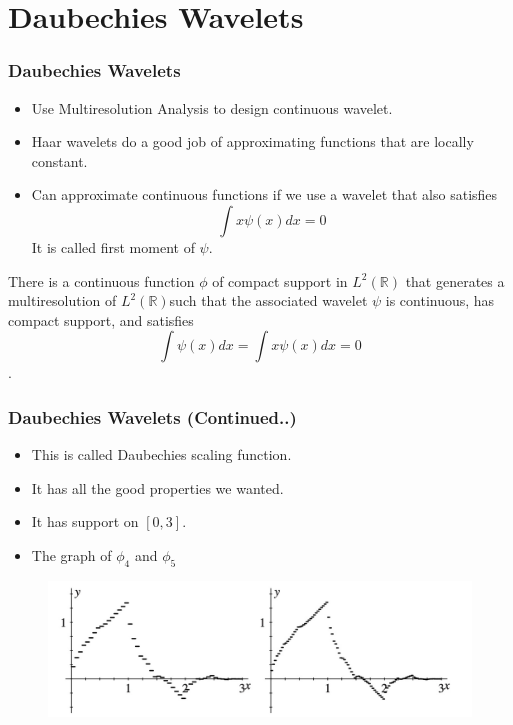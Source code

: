 \documentclass{beamer}
\begin{document}
\section{Daubechies Wavelets} %
\begin{frame}
\frametitle{Daubechies Wavelets}

\begin{itemize}
    \item Use Multiresolution Analysis to design continuous wavelet.
    \item Haar wavelets do a good job of approximating functions that are locally constant.
    \item Can approximate continuous functions if we use a wavelet that also satisfies $$\int x\psi(x) dx = 0$$ It is called first moment of $\psi$.
\end{itemize}

\begin{theorem}[15.5.1]
    There is a continuous function $\phi$ of compact support in $L^2(\mathbb{R}) $
    that generates a multiresolution of $L^2(\mathbb{R}) $such that the associated wavelet $\psi$ is continuous, 
    has compact support, and satisfies $$\int \psi(x) dx = \int x\psi(x) dx = 0$$.
\end{theorem}

\end{frame}

\begin{frame}
    \frametitle{Daubechies Wavelets (Continued..)}
    
    \begin{itemize}
        \item This is called Daubechies scaling function.
        \item It has all the good properties we wanted.
        \item It has support on $[0,3]$.
        \item The graph  of $\phi_4$ and $\phi_5$
    \end{itemize}

    \begin{figure}
        \includegraphics[width=0.8\linewidth]{daubechies.jpg}
    \end{figure}
    
\end{frame}
    
\end{document}
